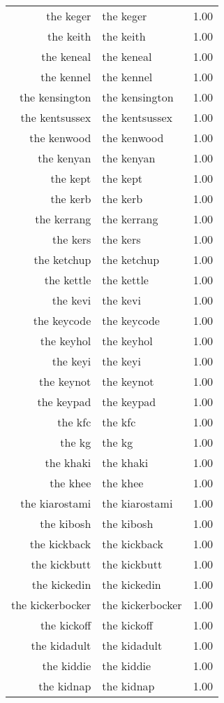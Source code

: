 \begin{table}[ht]
\begin{tabular}{rlr}
  the keger & the keger & 1.00 \\ 
  the keith & the keith & 1.00 \\ 
  the keneal & the keneal & 1.00 \\ 
  the kennel & the kennel & 1.00 \\ 
  the kensington & the kensington & 1.00 \\ 
  the kentsussex & the kentsussex & 1.00 \\ 
  the kenwood & the kenwood & 1.00 \\ 
  the kenyan & the kenyan & 1.00 \\ 
  the kept & the kept & 1.00 \\ 
  the kerb & the kerb & 1.00 \\ 
  the kerrang & the kerrang & 1.00 \\ 
  the kers & the kers & 1.00 \\ 
  the ketchup & the ketchup & 1.00 \\ 
  the kettle & the kettle & 1.00 \\ 
  the kevi & the kevi & 1.00 \\ 
  the keycode & the keycode & 1.00 \\ 
  the keyhol & the keyhol & 1.00 \\ 
  the keyi & the keyi & 1.00 \\ 
  the keynot & the keynot & 1.00 \\ 
  the keypad & the keypad & 1.00 \\ 
  the kfc & the kfc & 1.00 \\ 
  the kg & the kg & 1.00 \\ 
  the khaki & the khaki & 1.00 \\ 
  the khee & the khee & 1.00 \\ 
  the kiarostami & the kiarostami & 1.00 \\ 
  the kibosh & the kibosh & 1.00 \\ 
  the kickback & the kickback & 1.00 \\ 
  the kickbutt & the kickbutt & 1.00 \\ 
  the kickedin & the kickedin & 1.00 \\ 
  the kickerbocker & the kickerbocker & 1.00 \\ 
  the kickoff & the kickoff & 1.00 \\ 
  the kidadult & the kidadult & 1.00 \\ 
  the kiddie & the kiddie & 1.00 \\ 
  the kidnap & the kidnap & 1.00 \\ 

\end{tabular}
\end{table}
